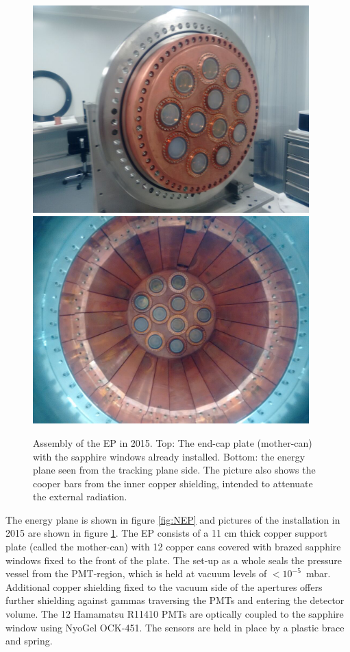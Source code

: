 \begin{figure}[hpt!]
\centering
\includegraphics[height=8cm]{img2/EP_ENDCUP.png}
\includegraphics[height=8cm]{img2/EPI.png}
\caption{Assembly of the EP in 2015. Top: The end-cap plate (mother-can) with the sapphire windows already installed. Bottom: the energy plane seen from the tracking plane side. The picture also shows the cooper bars from the inner copper shielding, intended to attenuate the external radiation. } \label{fig.EPA}
\end{figure}

The energy plane is shown in figure \ref{fig:NEP} and pictures of the installation in 2015 are shown in
figure \ref{fig.EPA}. The EP 
consists of a 11 cm thick copper support plate (called the mother-can) with 12 copper cans
covered with brazed sapphire windows fixed to the front of the plate. The
set-up as a whole seals the pressure vessel from the PMT-region,
which is held at vacuum levels of
$<10^{-5}$~mbar. Additional copper shielding fixed to the
vacuum side of the apertures offers further shielding against gammas traversing the PMTs and
entering the detector volume. The 12 Hamamatsu R11410 PMTs are optically coupled to 
the sapphire window using NyoGel OCK-451. The sensors are held in place by a plastic brace and spring.

